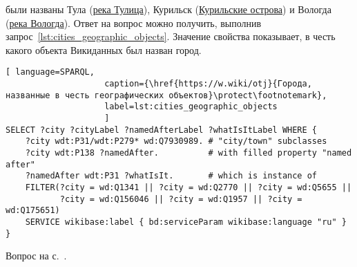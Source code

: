 \begin{task}
    \label{answer:cities_geographic_objects}
     были названы 
    Тула (\href{https://w.wiki/oLJ}{река Тулица}), 
    Курильск (\href{https://w.wiki/oLH}{Курильские острова}) 
    и Вологда (\href{https://w.wiki/oLG}{река Вологда}). 
    Ответ на вопрос можно получить, выполнив запрос~\ref{lst:cities_geographic_objects}. 
    Значение свойства  
    показывает, в честь какого объекта Викиданных был назван город.
   
\begin{lstlisting}[ language=SPARQL, 
                    caption={\href{https://w.wiki/otj}{Города, названные в честь географических объектов}\protect\footnotemark},
                    label=lst:cities_geographic_objects
                    ]
SELECT ?city ?cityLabel ?namedAfterLabel ?whatIsItLabel WHERE {
    ?city wdt:P31/wdt:P279* wd:Q7930989. # "city/town" subclasses
    ?city wdt:P138 ?namedAfter.          # with filled property "named after"
    ?namedAfter wdt:P31 ?whatIsIt.       # which is instance of
    FILTER(?city = wd:Q1341 || ?city = wd:Q2770 || ?city = wd:Q5655 ||
           ?city = wd:Q156046 || ?city = wd:Q1957 || ?city = wd:Q175651)
    SERVICE wikibase:label { bd:serviceParam wikibase:language "ru" }
}
\end{lstlisting}%
    \small{Вопрос на с.~\pageref{lst:population_town}.}
\end{task}

